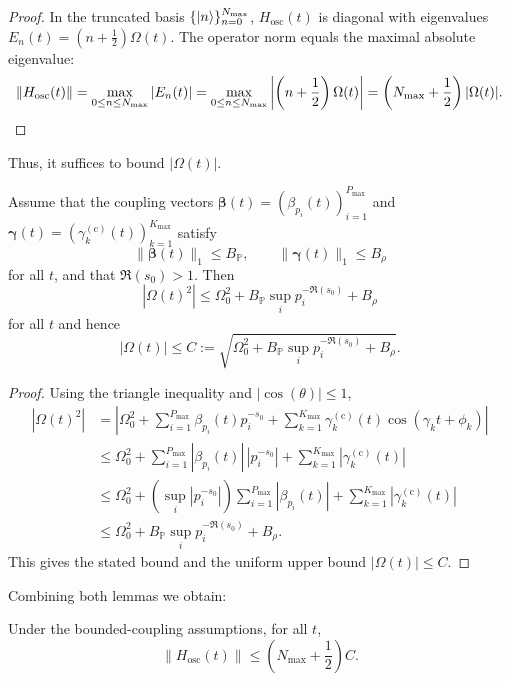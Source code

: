 \documentclass[11pt]{article}
\begin{document}
\begin{proof}
In the truncated basis $\{\ket{n}\}_{n=0}^{N_{\max}}$, $H_{\text{osc}}(t)$ is diagonal with eigenvalues $E_n(t)=(n+\frac{1}{2})\Omega(t)$. The operator norm equals the maximal absolute eigenvalue:
\[
\|H_{\text{osc}}(t)\| = \max_{0\le n\le N_{\max}} |E_n(t)| = \max_{0\le n\le N_{\max}} \left|\left(n+\frac{1}{2}\right)\Omega(t)\right|
= \left(N_{\max}+\frac{1}{2}\right) |\Omega(t)|.\qedhere
\]
\end{proof}

Thus, it suffices to bound $|\Omega(t)|$.

\begin{lemma}
Assume that the coupling vectors $\bm{\beta}(t)=(\beta_{p_i}(t))_{i=1}^{P_{\max}}$ and $\bm{\gamma}(t)=(\gamma_k^{\mathrm{(c)}}(t))_{k=1}^{K_{\max}}$ satisfy
\[
\|\bm{\beta}(t)\|_1 \le B_{\mathbb{P}},\qquad \|\bm{\gamma}(t)\|_1 \le B_{\rho}
\]
for all $t$, and that $\Re(s_0)>1$. Then
\[
|\Omega(t)^2| \le \Omega_0^2 + B_{\mathbb{P}} \sup_{i} p_i^{-\Re(s_0)} + B_{\rho}
\]
for all $t$ and hence
\[
|\Omega(t)| \le C := \sqrt{\Omega_0^2 + B_{\mathbb{P}} \sup_i p_i^{-\Re(s_0)} + B_{\rho}}.
\]
\end{lemma}

\begin{proof}
Using the triangle inequality and $|\cos(\theta)|\le 1$,
\begin{align*}
|\Omega(t)^2| 
&= \left| \Omega_0^2 + \sum_{i=1}^{P_{\max}} \beta_{p_i}(t) p_i^{-s_0} + \sum_{k=1}^{K_{\max}} \gamma_k^{\mathrm{(c)}}(t) \cos(\gamma_k t + \phi_k)\right| \\
&\le \Omega_0^2 + \sum_{i=1}^{P_{\max}} |\beta_{p_i}(t)|\, |p_i^{-s_0}| + \sum_{k=1}^{K_{\max}} |\gamma_k^{\mathrm{(c)}}(t)| \\
&\le \Omega_0^2 + \left(\sup_i |p_i^{-s_0}|\right) \sum_{i=1}^{P_{\max}} |\beta_{p_i}(t)| + \sum_{k=1}^{K_{\max}} |\gamma_k^{\mathrm{(c)}}(t)| \\
&\le \Omega_0^2 + B_{\mathbb{P}} \sup_i p_i^{-\Re(s_0)} + B_{\rho}.
\end{align*}
This gives the stated bound and the uniform upper bound $|\Omega(t)|\le C$.
\end{proof}

Combining both lemmas we obtain:

\begin{corollary}
Under the bounded-coupling assumptions, for all $t$,
\[
\|H_{\text{osc}}(t)\| \le \left(N_{\max} + \frac12\right) C.
\]
\end{corollary}
\end{document}
